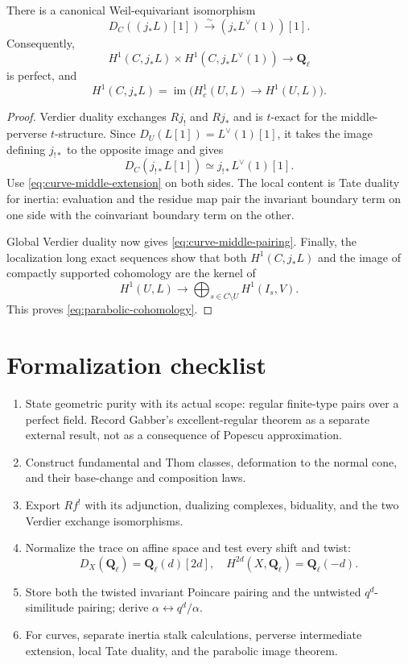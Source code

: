 \begin{theorem}
\label{thm:curve-middle-duality}
There is a canonical Weil-equivariant isomorphism
\[
 D_C((j_*L)[1])
 \xrightarrow{\sim}(j_*L^\vee(1))[1].
\tag{7.16}\label{eq:jstar-local-duality}
\]
Consequently,
\[
 H^1(C,j_*L)\times H^1(C,j_*L^\vee(1))
 \longrightarrow\mathbf Q_\ell
\tag{7.17}\label{eq:curve-middle-pairing}
\]
is perfect, and
\[
 H^1(C,j_*L)
 =
 \operatorname{im}\bigl(H_c^1(U,L)\to H^1(U,L)\bigr).
\tag{7.18}\label{eq:parabolic-cohomology}
\]
\end{theorem}

\begin{proof}
Verdier duality exchanges \(Rj_!\) and \(Rj_*\) and is \(t\)-exact for the
middle-perverse \(t\)-structure.  Since
\(D_U(L[1])=L^\vee(1)[1]\), it takes the image defining \(j_{!*}\) to the
opposite image and gives
\[
 D_C(j_{!*}L[1])\simeq j_{!*}L^\vee(1)[1].
\]
Use \eqref{eq:curve-middle-extension} on both sides.  The local content is
Tate duality for inertia: evaluation and the residue map pair the invariant
boundary term on one side with the coinvariant boundary term on the other.

Global Verdier duality now gives \eqref{eq:curve-middle-pairing}.  Finally,
the localization long exact sequences show that both
\(H^1(C,j_*L)\) and the image of compactly supported cohomology are the kernel
of
\[
 H^1(U,L)\longrightarrow
 \bigoplus_{s\in C\setminus U}H^1(I_s,V).
\]
This proves \eqref{eq:parabolic-cohomology}.
\end{proof}

\section{Formalization checklist}

\begin{enumerate}
\item State geometric purity with its actual scope: regular finite-type pairs
over a perfect field.  Record Gabber's excellent-regular theorem as a separate
external result, not as a consequence of Popescu approximation.
\item Construct fundamental and Thom classes, deformation to the normal cone,
and their base-change and composition laws.
\item Export \(Rf^!\) with its adjunction, dualizing complexes, biduality, and
the two Verdier exchange isomorphisms.
\item Normalize the trace on affine space and test every shift and twist:
\[
 D_X(\mathbf Q_\ell)=\mathbf Q_\ell(d)[2d],\quad
 H^{2d}(X,\mathbf Q_\ell)=\mathbf Q_\ell(-d).
\]
\item Store both the twisted invariant Poincare pairing and the untwisted
\(q^d\)-similitude pairing; derive
\(\alpha\leftrightarrow q^d/\alpha\).
\item For curves, separate inertia stalk calculations, perverse intermediate
extension, local Tate duality, and the parabolic image theorem.
\end{enumerate}

